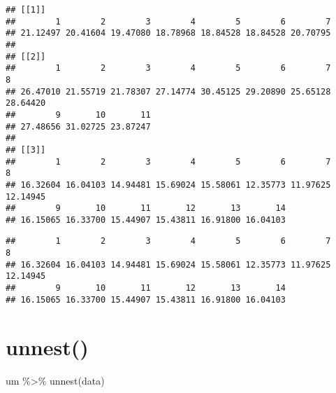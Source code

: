 \documentclass[
]{book}
\newenvironment{Shaded}{\begin{snugshade}}{\end{snugshade}}
\newcommand{\DecValTok}[1]{\textcolor[rgb]{0.00,0.00,0.81}{#1}}
\newcommand{\FunctionTok}[1]{\textcolor[rgb]{0.00,0.00,0.00}{#1}}
\newcommand{\NormalTok}[1]{#1}
\newcommand{\SpecialCharTok}[1]{\textcolor[rgb]{0.00,0.00,0.00}{#1}}
\begin{document}
\begin{verbatim}
## [[1]]
##        1        2        3        4        5        6        7 
## 21.12497 20.41604 19.47080 18.78968 18.84528 18.84528 20.70795 
## 
## [[2]]
##        1        2        3        4        5        6        7        8 
## 26.47010 21.55719 21.78307 27.14774 30.45125 29.20890 25.65128 28.64420 
##        9       10       11 
## 27.48656 31.02725 23.87247 
## 
## [[3]]
##        1        2        3        4        5        6        7        8 
## 16.32604 16.04103 14.94481 15.69024 15.58061 12.35773 11.97625 12.14945 
##        9       10       11       12       13       14 
## 16.15065 16.33700 15.44907 15.43811 16.91800 16.04103
\end{verbatim}

\begin{Shaded}
\end{Shaded}

\begin{verbatim}
##        1        2        3        4        5        6        7        8 
## 16.32604 16.04103 14.94481 15.69024 15.58061 12.35773 11.97625 12.14945 
##        9       10       11       12       13       14 
## 16.15065 16.33700 15.44907 15.43811 16.91800 16.04103
\end{verbatim}

\hypertarget{unnest}{%
\section{unnest()}\label{unnest}}

\begin{Shaded}
\begin{Highlighting}[]
\NormalTok{um }\SpecialCharTok{\%\textgreater{}\%} 
  \FunctionTok{unnest}\NormalTok{(data)}
\end{Highlighting}
\end{Shaded}
\end{document}
